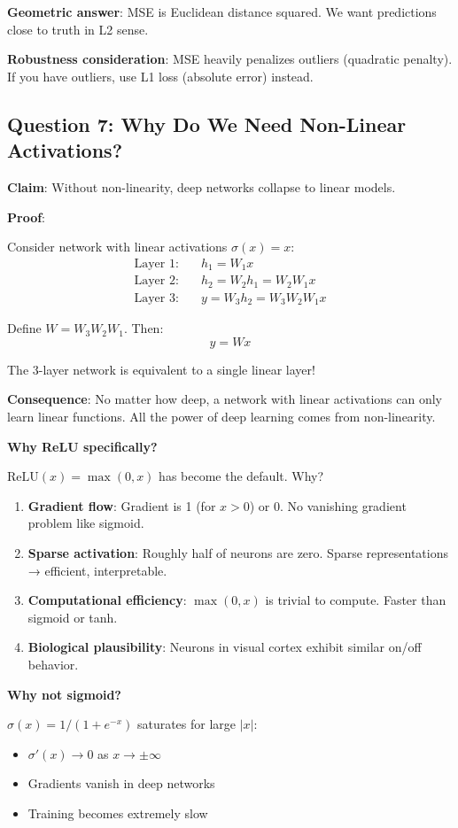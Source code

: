 \documentclass[11pt,oneside]{book}
\begin{document}
\textbf{Geometric answer}: MSE is Euclidean distance squared. We want predictions close to truth in L2 sense.

\textbf{Robustness consideration}: MSE heavily penalizes outliers (quadratic penalty). If you have outliers, use L1 loss (absolute error) instead.

\subsection{Question 7: Why Do We Need Non-Linear Activations?}

\textbf{Claim}: Without non-linearity, deep networks collapse to linear models.

\textbf{Proof}:

Consider network with linear activations $\sigma(x) = x$:
\begin{align*}
\text{Layer 1:} \quad & h_1 = W_1 x \\
\text{Layer 2:} \quad & h_2 = W_2 h_1 = W_2 W_1 x \\
\text{Layer 3:} \quad & y = W_3 h_2 = W_3 W_2 W_1 x
\end{align*}

Define $W = W_3 W_2 W_1$. Then:
\[
y = W x
\]

The 3-layer network is equivalent to a single linear layer!

\textbf{Consequence}: No matter how deep, a network with linear activations can only learn linear functions. All the power of deep learning comes from non-linearity.

\textbf{Why ReLU specifically?}

$\text{ReLU}(x) = \max(0, x)$ has become the default. Why?

\begin{enumerate}
\item \textbf{Gradient flow}: Gradient is 1 (for $x > 0$) or 0. No vanishing gradient problem like sigmoid.
\item \textbf{Sparse activation}: Roughly half of neurons are zero. Sparse representations → efficient, interpretable.
\item \textbf{Computational efficiency}: $\max(0,x)$ is trivial to compute. Faster than sigmoid or tanh.
\item \textbf{Biological plausibility}: Neurons in visual cortex exhibit similar on/off behavior.
\end{enumerate}

\textbf{Why not sigmoid?}

$\sigma(x) = 1/(1 + e^{-x})$ saturates for large $|x|$:
\begin{itemize}
\item $\sigma'(x) \to 0$ as $x \to \pm\infty$
\item Gradients vanish in deep networks
\item Training becomes extremely slow
\end{itemize}
\end{document}
